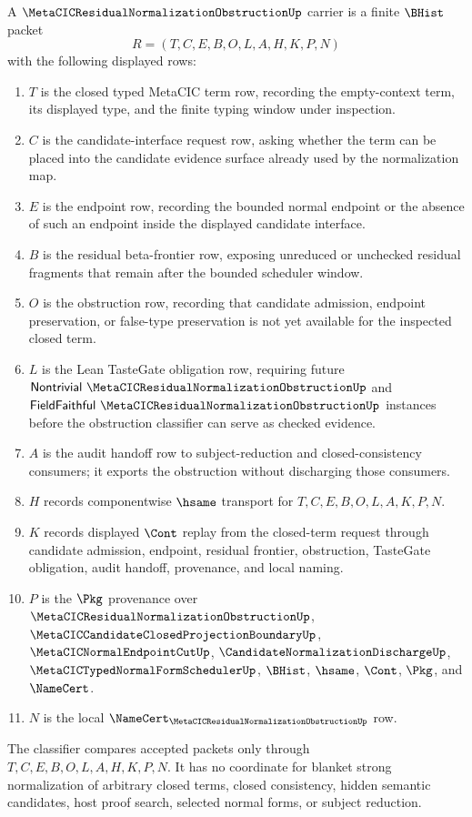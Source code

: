 \begin{definition}
\label{def:metacic-residual-normalization-obstruction-carrier}
A $\MetaCICResidualNormalizationObstructionUp$ carrier is a finite $\BHist$ packet
$$
R=(T,C,E,B,O,L,A,H,K,P,N)
$$
with the following displayed rows:
\begin{enumerate}
\item $T$ is the closed typed MetaCIC term row, recording the empty-context term, its displayed type, and the finite typing window under inspection.
\item $C$ is the candidate-interface request row, asking whether the term can be placed into the candidate evidence surface already used by the normalization map.
\item $E$ is the endpoint row, recording the bounded normal endpoint or the absence of such an endpoint inside the displayed candidate interface.
\item $B$ is the residual beta-frontier row, exposing unreduced or unchecked residual fragments that remain after the bounded scheduler window.
\item $O$ is the obstruction row, recording that candidate admission, endpoint preservation, or false-type preservation is not yet available for the inspected closed term.
\item $L$ is the Lean TasteGate obligation row, requiring future $\mathsf{Nontrivial}\ \MetaCICResidualNormalizationObstructionUp$ and $\mathsf{FieldFaithful}\ \MetaCICResidualNormalizationObstructionUp$ instances before the obstruction classifier can serve as checked evidence.
\item $A$ is the audit handoff row to subject-reduction and closed-consistency consumers; it exports the obstruction without discharging those consumers.
\item $H$ records componentwise $\hsame$ transport for $T,C,E,B,O,L,A,K,P,N$.
\item $K$ records displayed $\Cont$ replay from the closed-term request through candidate admission, endpoint, residual frontier, obstruction, TasteGate obligation, audit handoff, provenance, and local naming.
\item $P$ is the $\Pkg$ provenance over $\MetaCICResidualNormalizationObstructionUp$, $\MetaCICCandidateClosedProjectionBoundaryUp$, $\MetaCICNormalEndpointCutUp$, $\CandidateNormalizationDischargeUp$, $\MetaCICTypedNormalFormSchedulerUp$, $\BHist$, $\hsame$, $\Cont$, $\Pkg$, and $\NameCert$.
\item $N$ is the local $\NameCert_{\MetaCICResidualNormalizationObstructionUp}$ row.
\end{enumerate}
The classifier compares accepted packets only through $T,C,E,B,O,L,A,H,K,P,N$. It has no coordinate for blanket strong normalization of arbitrary closed terms, closed consistency, hidden semantic candidates, host proof search, selected normal forms, or subject reduction.
\end{definition}

